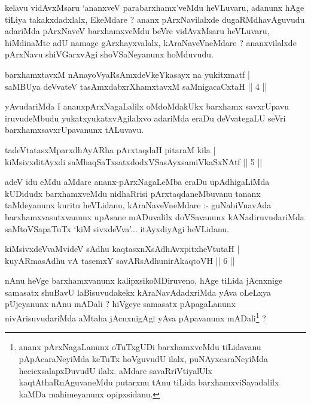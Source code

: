 \begin{artha}
kelavu vidAvxMsaru `ananxveV parabarxhamx'veMdu heVLuvaru, adanunx hAge tiLiya takakxdadxlalx, EkeMdare ? ananx pArxNavilalxde dugaRMdhavAguvudu adariMda pArxNaveV barxhamxveMdu beVre vidAvxMsaru heVLuvaru, hiMdinaMte adU namage gArxhayxvalalx, kAraNaveVneMdare ? ananxvilalxde pArxNavu shiVGarxvAgi shoVSaNeyanunx hoMduvudu.
\end{artha}

\begin{shl}
barxhamxtavxM nAnayoVyaRsAmxdeVkeYkasayx na yukitxmatf | \\
saMBUya deVvateV tasAmxdabxrXhamxtavxM saMnigacaCxtaH \hfill ||  4 || 
\end{shl}

\begin{artha}
yAvudariMda I ananxpArxNagaLalilx oMdoMdakUkx barxhamx savxrUpavu iruvudeMbudu yukatxyukatxvAgilalxvo adariMda eraDu deVvategaLU seVri barxhamxsavxrUpavanunx tALuvavu.
\end{artha}

\begin{shl}
tadeVtatasxMparxdhAyAR\s \s ha pArxtaqdaH pitaraM kila | \\
kiMsivxditAyxdi saMhaqSaTxsatxdodxVSasAyxsamiVkaSxNAtf \hfill ||  5 || 
\end{shl}

\begin{artha}
adeV idu eMdu aMdare ananx-pArxNagaLeMba eraDu upAdhigaLiMda kUDidudx barxhamxveMdu nidhaRrisi pArxtaqdaneMbuvanu tananx taMdeyanunx kuritu heVLidanu, kAraNaveVneMdare :- guNahiVnavAda barxhamxvasutxvanunx upAsane mADuvalilx doVSavanunx kANadiruvudariMda saMtoVSapaTuTx `kiM sivxdeVva'... itAyxdiyAgi heVLidanu.
\end{artha}

\begin{shl}
kiMsivxdeVvaMvideV sAdhu kaqtasxnXsAdhAvxpitxheVtutaH | \\
kuyARmasAdhu vA tasemxY savARsAdhunirAkaqtoVH \hfill ||  6 || 
\end{shl}

\begin{artha}
nAnu heVge barxhamxvanunx kalipxsikoMDiruveno, hAge tiLida jAcnxnige samasatx shuBavU laBisuvudakekx kAraNavAdadxriMda yAva oLeLxya pUjeyanunx nAnu mADali ? hiVgeye samasatx pApagaLanunx nivArisuvudariMda aMtaha jAcnxnigAgi yAva pApavanunx mADali\footnote{ananx pArxNagaLanunx oTuTxgUDi barxhamxveMdu tiLidavanu pApAcaraNeyiMda keTuTx hoVguvudU ilalx, puNAyxcaraNeyiMda hecicxsalapxDuvudU ilalx. aMdare savaRriVtiyalUlx kaqtAthaRnAguvaneMdu putarxnu tAnu tiLida barxhamxviSayadalilx kaMDa mahimeyanunx opipxsidanu.} ?
\end{artha}

